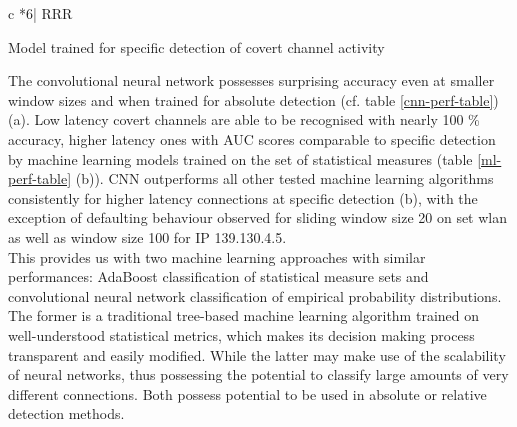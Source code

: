 \documentclass[12pt,a4paper,automark, toc=bib]{scrreprt}
\theoremstyle{definition}
\begin{document}
\begin{table}
\begin{subtable}{\linewidth}
\begin{tabular}{c *6{| RRR }}
					
						
					\end{tabular}
					\caption{Model trained for specific detection of covert channel activity}	
				\end{subtable}
				\caption{Performance $[\%]$ of convolutional neural network trained to distinguish covert from overt empirical probability distributions of network traffic packet delays for hash md5 with differentiation between different window sizes}
				\label{cnn-perf-table}
			\end{table}
			The convolutional neural network possesses surprising accuracy even at smaller window sizes and when trained for absolute detection (cf. table \ref{cnn-perf-table}) (a). Low latency covert channels are able to be recognised with nearly 100 \% accuracy, higher latency ones with AUC scores comparable to specific detection by machine learning models trained on the set of statistical measures (table \ref{ml-perf-table} (b)). CNN outperforms all other tested machine learning algorithms consistently for higher latency connections at specific detection (b), with the exception of defaulting behaviour observed for sliding window size 20 on set wlan as well as window size 100 for IP 139.130.4.5. \\
			This provides us with two machine learning approaches with similar performances: AdaBoost classification of statistical measure sets and convolutional neural network classification of empirical probability distributions. The former is a traditional tree-based machine learning algorithm trained on well-understood statistical metrics, which makes its decision making process transparent and easily modified. While the latter may make use of the scalability of neural networks, thus possessing the potential to classify large amounts of very different connections. Both possess potential to be used in absolute or relative detection methods.\\ 
\end{document}

